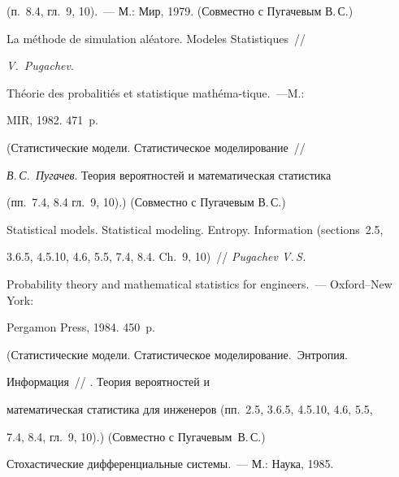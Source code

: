 (п.~8.4, гл.~9, 10).~--- М.: Мир, 1979. (Совместно с Пугачевым В.\,С.)


\vspace*{-6pt}










 La m\'{e}thode de simulation al\'{e}atore. Modeles Statistiques~//\linebreak


 \textit{V.~Pugachev}.


 Th\'{e}orie des probaliti\'{e}s et statistique math\'{e}ma-\linebreak tique.~---M.:


  MIR, 1982. 471~p.


 (Статистические модели. Статистическое моделирование~//


\textit{В.\,С.~Пугачев}. Теория вероятностей и математическая статистика


(пп.~7.4, 8.4 гл.~9, 10).) (Совместно с Пугачевым В.\,С.)


\vspace*{-6pt}










 Statistical models. Statistical modeling. Entropy. Information (sections~2.5,


 3.6.5, 4.5.10, 4.6, 5.5, 7.4, 8.4. Ch.~9, 10)~// \textit{Pugachev V.\,S.}


 Probability theory and mathematical statistics for engineers.~--- Oxford--New York:


 Pergamon Press, 1984. 450~p.


(Статистические модели. Статистическое моделирование.\ Энтропия.


Информация~// . Теория вероятностей и


математическая статистика для инженеров (пп.~2.5, 3.6.5, 4.5.10, 4.6, 5.5,


7.4, 8.4, гл.~9, 10).) (Совместно с Пугачевым~В.\,С.)










 Стохастические дифференциальные системы.~--- М.: Наука, 1985.



